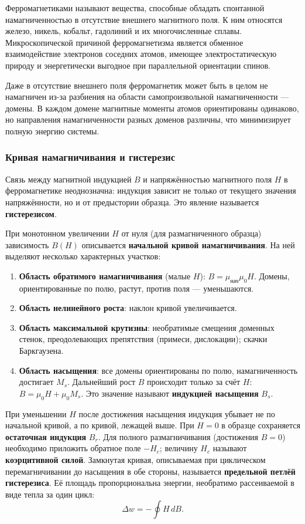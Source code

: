 \documentclass[a4paper]{article}
\begin{document}
Ферромагнетиками называют вещества, способные обладать спонтанной намагниченностью в отсутствие внешнего магнитного поля. К ним относятся железо, никель, кобальт, гадолиний и их многочисленные сплавы. Микроскопической причиной ферромагнетизма является обменное взаимодействие электронов соседних атомов, имеющее электростатическую природу и энергетически выгодное при параллельной ориентации спинов.

Даже в отсутствие внешнего поля ферромагнетик может быть в целом не намагничен из-за разбиения на области самопроизвольной намагниченности — домены. В каждом домене магнитные моменты атомов ориентированы одинаково, но направления намагниченности разных доменов различны, что минимизирует полную энергию системы.

\subsubsection{Кривая намагничивания и гистерезис}

Связь между магнитной индукцией $B$ и напряжённостью магнитного поля $H$ в ферромагнетике неоднозначна: индукция зависит не только от текущего значения напряжённости, но и от предыстории образца. Это явление называется \textbf{гистерезисом}.

При монотонном увеличении $H$ от нуля (для размагниченного образца) зависимость $B(H)$ описывается \textbf{начальной кривой намагничивания}. На ней выделяют несколько характерных участков:

\begin{enumerate}
	\item \textbf{Область обратимого намагничивания} (малые $H$): $B = \mu_{\text{нач}} \mu_0 H$. Домены, ориентированные по полю, растут, против поля — уменьшаются.
	\item \textbf{Область нелинейного роста}: наклон кривой увеличивается.
	\item \textbf{Область максимальной крутизны}: необратимые смещения доменных стенок, преодолевающих препятствия (примеси, дислокации); скачки Баркгаузена.
	\item \textbf{Область насыщения}: все домены ориентированы по полю, намагниченность достигает $M_s$. Дальнейший рост $B$ происходит только за счёт $H$: $B = \mu_0 H + \mu_0 M_s$. Это значение называют \textbf{индукцией насыщения} $B_s$.
\end{enumerate}

При уменьшении $H$ после достижения насыщения индукция убывает не по начальной кривой, а по кривой, лежащей выше. При $H = 0$ в образце сохраняется \textbf{остаточная индукция} $B_r$. Для полного размагничивания (достижения $B = 0$) необходимо приложить обратное поле $-H_c$; величину $H_c$ называют \textbf{коэрцитивной силой}. Замкнутая кривая, описываемая при циклическом перемагничивании до насыщения в обе стороны, называется \textbf{предельной петлёй гистерезиса}. Её площадь пропорциональна энергии, необратимо рассеиваемой в виде тепла за один цикл:
\[
\Delta w = -\oint H \, dB.
\]
\end{document}
